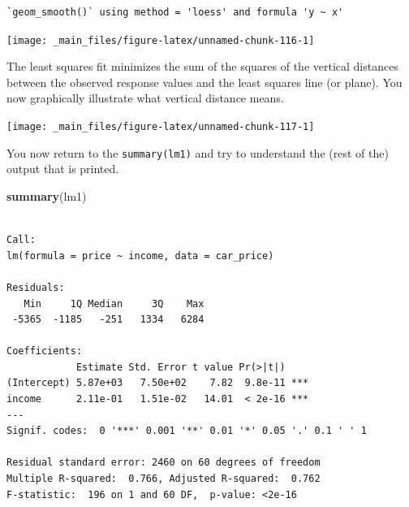 \documentclass[
]{book}
\newenvironment{Shaded}{\begin{snugshade}}{\end{snugshade}}
\newcommand{\DataTypeTok}[1]{\textcolor[rgb]{0.13,0.29,0.53}{#1}}
\newcommand{\DecValTok}[1]{\textcolor[rgb]{0.00,0.00,0.81}{#1}}
\newcommand{\FloatTok}[1]{\textcolor[rgb]{0.00,0.00,0.81}{#1}}
\newcommand{\KeywordTok}[1]{\textcolor[rgb]{0.13,0.29,0.53}{\textbf{#1}}}
\newcommand{\NormalTok}[1]{#1}
\newcommand{\OperatorTok}[1]{\textcolor[rgb]{0.81,0.36,0.00}{\textbf{#1}}}
\newcommand{\StringTok}[1]{\textcolor[rgb]{0.31,0.60,0.02}{#1}}
\begin{document}
\begin{verbatim}
`geom_smooth()` using method = 'loess' and formula 'y ~ x'
\end{verbatim}

\begin{center}\texttt{[image: \_main\_files/figure-latex/unnamed-chunk-116-1]} \end{center}

The least squares fit minimizes the sum of the squares of the vertical distances between the observed response values and the least squares line (or plane). You now graphically illustrate what vertical distance means.

\begin{Shaded}
\end{Shaded}

\begin{center}\texttt{[image: \_main\_files/figure-latex/unnamed-chunk-117-1]} \end{center}

You now return to the \texttt{summary(lm1)} and try to understand the (rest of the) output that is printed.

\begin{Shaded}
\begin{Highlighting}[]
\KeywordTok{summary}\NormalTok{(lm1)}
\end{Highlighting}
\end{Shaded}

\begin{verbatim}

Call:
lm(formula = price ~ income, data = car_price)

Residuals:
   Min     1Q Median     3Q    Max 
 -5365  -1185   -251   1334   6284 

Coefficients:
            Estimate Std. Error t value Pr(>|t|)    
(Intercept) 5.87e+03   7.50e+02    7.82  9.8e-11 ***
income      2.11e-01   1.51e-02   14.01  < 2e-16 ***
---
Signif. codes:  0 '***' 0.001 '**' 0.01 '*' 0.05 '.' 0.1 ' ' 1

Residual standard error: 2460 on 60 degrees of freedom
Multiple R-squared:  0.766,	Adjusted R-squared:  0.762 
F-statistic:  196 on 1 and 60 DF,  p-value: <2e-16
\end{verbatim}
\end{document}
